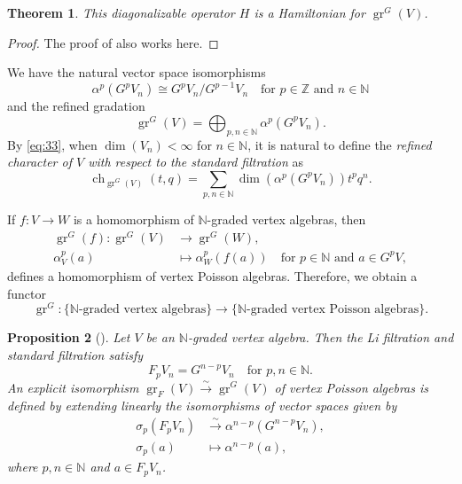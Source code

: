 \documentclass[a4paper, 12pt, reqno]{amsart}
\newtheorem{theorem}{Theorem}[section]
\newtheorem{proposition}[theorem]{Proposition}
\theoremstyle{remark}
\numberwithin{equation}{subsection}
\DeclareMathOperator{\gr}{gr}
\DeclareMathOperator{\ch}{ch}
\begin{document}
\begin{theorem}
  \label{thr:44}
  This diagonalizable operator $H$ is a Hamiltonian for $\gr^G(V)$.
\end{theorem}

\begin{proof}
  The proof of  also works here.
\end{proof}

We have the natural vector space isomorphisms
\begin{equation*}
  \alpha^p(G^pV_n) \cong G^pV_n/G^{p - 1}V_n \quad \text{for }p \in \mathbb{Z}\text{ and }n \in \mathbb{N}
\end{equation*}
and the refined gradation
\begin{equation}
  \label{eq:33}
  \gr^G(V) =\bigoplus_{p, n \in \mathbb{N}}\alpha^p(G^pV_n).
\end{equation}
By \eqref{eq:33}, when $\dim(V_n) < \infty$ for $n \in \mathbb{N}$, it is natural to define the \emph{refined character of $V$ with respect to the standard filtration} as
\begin{equation*}
  \ch_{\gr^G(V)}(t, q) = \sum_{p, n \in \mathbb{N}}\dim(\alpha^p(G^pV_n))t^pq^n.
\end{equation*}

If $f: V \to W$ is a homomorphism of $\mathbb{N}$-graded vertex algebras, then
\begin{align*}
  \gr^G(f): \gr^G(V) &\to \gr^G(W), \\
  \alpha_V^p(a) &\mapsto \alpha_W^p(f(a)) \quad \text{for }p \in \mathbb{N}\text{ and }a \in G^pV,
\end{align*}
defines a homomorphism of vertex Poisson algebras.
Therefore, we obtain a functor
\begin{equation*}
  \gr^G: \{\text{$\mathbb{N}$-graded vertex algebras}\} \to \{\text{$\mathbb{N}$-graded vertex Poisson algebras}\}.
\end{equation*}

\begin{proposition}[{\cite[Proposition 2.6.1]{arakawa_remark_2012}}]
  \label{prp:11}
  Let $V$ be an $\mathbb{N}$-graded vertex algebra.
  Then the Li filtration and standard filtration satisfy
  \begin{equation*}
    F_pV_n = G^{n - p}V_n \quad \text{for }p, n \in \mathbb{N}.
  \end{equation*}
  An explicit isomorphism $\gr_F(V) \xrightarrow{\sim} \gr^G(V)$ of vertex Poisson algebras is defined by extending linearly the isomorphisms of vector spaces given by
  \begin{align*}
    \sigma_p(F_pV_n) &\xrightarrow{\sim} \alpha^{n - p}(G^{n - p}V_n), \\
    \sigma_p(a) &\mapsto \alpha^{n - p}(a),
  \end{align*}
  where $p, n \in \mathbb{N}$ and $a \in F_pV_n$.
\end{proposition}
\end{document}
